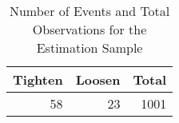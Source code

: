 \begin{table}[ht]
\centering
\caption{Number of Events and Total Observations for the Estimation Sample} 
\begin{tabular}{rrr}
  \hline
Tighten & Loosen & Total \\ 
  \hline
 58 &  23 & 1001 \\ 
   \hline
\end{tabular}
\end{table}
